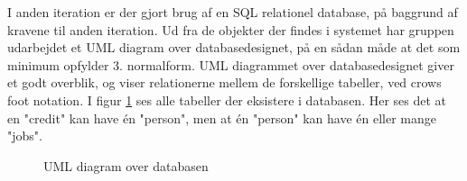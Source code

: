 I anden iteration er der gjort brug af en SQL relationel database, på baggrund af kravene til anden iteration. Ud fra de objekter der findes i systemet har gruppen udarbejdet et UML diagram over databasedesignet, på en sådan måde at det som minimum opfylder 3. normalform. 
UML diagrammet over databasedesignet giver et godt overblik, og viser relationerne mellem de forskellige tabeller, ved crows foot notation. I figur \ref{fig:databaseUML} ses alle tabeller der eksistere i databasen. Her ses det at en "credit" kan have én "person", men at én "person" kan have én eller mange "jobs". 
\begin{figure}[H]
    \centering
    \caption{UML diagram over databasen}
    \label{fig:databaseUML}
\end{figure}